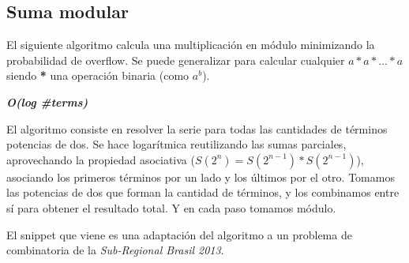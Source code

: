 \subsection*{Suma modular}

El siguiente algoritmo calcula una multiplicación en módulo minimizando la probabilidad de overflow.
Se puede generalizar para calcular cualquier $a * a * \dots * a$ siendo \textbf{*} una
operación binaria (como $a^b$).

\textit{\textbf{O(log \#terms)}}

El algoritmo consiste en resolver la serie para todas las cantidades
de términos potencias de dos. Se hace logarítmica reutilizando las sumas parciales, aprovechando
la propiedad asociativa ($S(2^n) = S(2^{n-1}) * S(2^{n-1})$), asociando los primeros términos
por un lado y los últimos por el otro. Tomamos las potencias de dos que forman la cantidad de
términos, y los combinamos entre sí para obtener el resultado total. Y en cada paso tomamos
módulo.

El snippet que viene es una adaptación del algoritmo a un problema de combinatoria de la
\textit{Sub-Regional Brasil 2013}.

